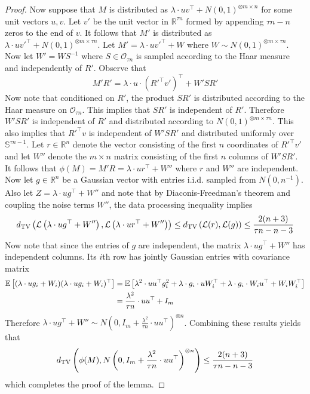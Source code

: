 \begin{proof}
Now suppose that $M$ is distributed as $\lambda \cdot uv^\top + N(0, 1)^{\otimes m \times n}$ for some unit vectors $u, v$. Let $v'$ be the unit vector in $\mathbb{R}^{\tau n}$ formed by appending $\tau n - n$ zeros to the end of $v$. It follows that $M'$ is distributed as $\lambda \cdot uv'^\top + N(0, 1)^{\otimes m \times \tau n}$. Let $M' = \lambda \cdot uv'^\top + W$ where $W \sim N(0, 1)^{\otimes m \times \tau n}$. Now let $W' = WS^{-1}$ where $S \in \mathcal{O}_{\tau n}$ is sampled according to the Haar measure and independently of $R'$. Observe that
$$M'R' = \lambda \cdot u \cdot \left( R'^\top v' \right)^\top + W' S R'$$
Now note that conditioned on $R'$, the product $SR'$ is distributed according to the Haar measure on $\mathcal{O}_{\tau n}$. This implies that $SR'$ is independent of $R'$. Therefore $W' S R'$ is independent of $R'$ and distributed according to $N(0, 1)^{\otimes m \times \tau n}$. This also implies that $R'^\top v$ is independent of $W' S R'$ and distributed uniformly over $\mathbb{S}^{\tau n - 1}$. Let $r \in \mathbb{R}^n$ denote the vector consisting of the first $n$ coordinates of $R'^\top v'$ and let $W''$ denote the $m \times n$ matrix consisting of the first $n$ columns of $W' S R'$. It follows that $\phi(M) = M' R = \lambda \cdot u r^\top + W''$ where $r$ and $W''$ are independent. Now let $g \in \mathbb{R}^n$ be a Gaussian vector with entries i.i.d. sampled from $N(0, n^{-1})$. Also let $Z = \lambda \cdot ug^\top + W''$ and note that by Diaconis-Freedman's theorem and coupling the noise terms $W''$, the data processing inequality implies
$$d_{\text{TV}}\left( \mathcal{L}\left( \lambda \cdot ug^\top + W'' \right), \mathcal{L}\left( \lambda \cdot ur^\top + W'' \right) \right) \le d_{\text{TV}}\left( \mathcal{L}(r), \mathcal{L}(g) \right) \le \frac{2(n + 3)}{\tau n - n - 3}$$
Now note that since the entries of $g$ are independent, the matrix $\lambda \cdot u g^\top + W''$ has independent columns. Its $i$th row has jointly Gaussian entries with covariance matrix
\begin{align*}
\mathbb{E}\left[ (\lambda \cdot u g_i + W_i) (\lambda \cdot u g_i + W_i)^\top \right] &= \mathbb{E}\left[ \lambda^2 \cdot uu^\top g_i^2 + \lambda \cdot g_i  \cdot u W_i^\top + \lambda \cdot g_i \cdot W_i u^\top + W_i W_i^\top \right] \\
&= \frac{\lambda^2}{\tau n} \cdot uu^\top + I_m
\end{align*}
Therefore $\lambda \cdot ug^\top + W'' \sim N\left(0, I_m + \frac{\lambda^2}{\tau n} \cdot uu^\top\right)^{\otimes n}$. Combining these results yields that
$$d_{\text{TV}}\left( \phi(M), N\left(0, I_m + \frac{\lambda^2}{\tau n} \cdot uu^\top\right)^{\otimes n} \right) \le \frac{2(n + 3)}{\tau n - n - 3}$$
which completes the proof of the lemma.
\end{proof}

